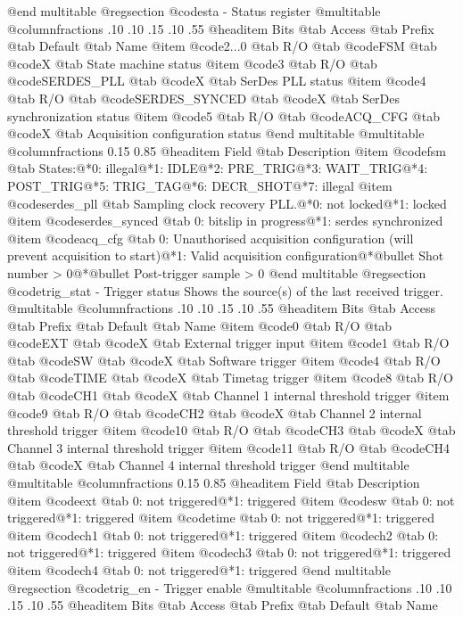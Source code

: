 @end multitable
@regsection @code{sta} - Status register
@multitable @columnfractions .10 .10 .15 .10 .55
@headitem Bits @tab Access @tab Prefix @tab Default @tab Name
@item @code{2...0}
@tab R/O @tab
@code{FSM}
@tab @code{X} @tab 
State machine status
@item @code{3}
@tab R/O @tab
@code{SERDES_PLL}
@tab @code{X} @tab 
SerDes PLL status
@item @code{4}
@tab R/O @tab
@code{SERDES_SYNCED}
@tab @code{X} @tab 
SerDes synchronization status
@item @code{5}
@tab R/O @tab
@code{ACQ_CFG}
@tab @code{X} @tab 
Acquisition configuration status
@end multitable
@multitable @columnfractions 0.15 0.85
@headitem Field @tab Description
@item @code{fsm} @tab States:@*0: illegal@*1: IDLE@*2: PRE_TRIG@*3: WAIT_TRIG@*4: POST_TRIG@*5: TRIG_TAG@*6: DECR_SHOT@*7: illegal
@item @code{serdes_pll} @tab Sampling clock recovery PLL.@*0: not locked@*1: locked
@item @code{serdes_synced} @tab 0: bitslip in progress@*1: serdes synchronized
@item @code{acq_cfg} @tab 0: Unauthorised acquisition configuration (will prevent acquisition to start)@*1: Valid acquisition configuration@*@bullet{}  Shot number > 0@*@bullet{}  Post-trigger sample > 0
@end multitable
@regsection @code{trig_stat} - Trigger status
Shows the source(s) of the last received trigger.
@multitable @columnfractions .10 .10 .15 .10 .55
@headitem Bits @tab Access @tab Prefix @tab Default @tab Name
@item @code{0}
@tab R/O @tab
@code{EXT}
@tab @code{X} @tab 
External trigger input
@item @code{1}
@tab R/O @tab
@code{SW}
@tab @code{X} @tab 
Software trigger
@item @code{4}
@tab R/O @tab
@code{TIME}
@tab @code{X} @tab 
Timetag trigger
@item @code{8}
@tab R/O @tab
@code{CH1}
@tab @code{X} @tab 
Channel 1 internal threshold trigger
@item @code{9}
@tab R/O @tab
@code{CH2}
@tab @code{X} @tab 
Channel 2 internal threshold trigger
@item @code{10}
@tab R/O @tab
@code{CH3}
@tab @code{X} @tab 
Channel 3 internal threshold trigger
@item @code{11}
@tab R/O @tab
@code{CH4}
@tab @code{X} @tab 
Channel 4 internal threshold trigger
@end multitable
@multitable @columnfractions 0.15 0.85
@headitem Field @tab Description
@item @code{ext} @tab 0: not triggered@*1: triggered
@item @code{sw} @tab 0: not triggered@*1: triggered
@item @code{time} @tab 0: not triggered@*1: triggered
@item @code{ch1} @tab 0: not triggered@*1: triggered
@item @code{ch2} @tab 0: not triggered@*1: triggered
@item @code{ch3} @tab 0: not triggered@*1: triggered
@item @code{ch4} @tab 0: not triggered@*1: triggered
@end multitable
@regsection @code{trig_en} - Trigger enable
@multitable @columnfractions .10 .10 .15 .10 .55
@headitem Bits @tab Access @tab Prefix @tab Default @tab Name
